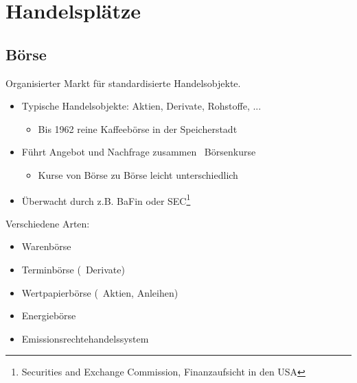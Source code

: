 \documentclass{beamer}
\begin{document}
	\section{Handelsplätze}
	
		\begin{frame}
		\end{frame}
	
		\subsection{Börse}
		
			\begin{frame}
				\begin{definition}
					Organisierter Markt für standardisierte Handelsobjekte.\citewiki[Börse]{B\%Crse}
				\end{definition}
				\begin{itemize}
					\item Typische Handelsobjekte: Aktien, Derivate, Rohstoffe, ...
					\begin{itemize}
						\item Bis 1962 reine Kaffeebörse in der Speicherstadt
					\end{itemize}
					\item Führt Angebot und Nachfrage zusammen \textrightarrow\ Börsenkurse
					\begin{itemize}
						\item Kurse von Börse zu Börse leicht unterschiedlich
					\end{itemize}
					\item Überwacht durch z.B. BaFin oder SEC\footnote{Securities and Exchange Commission, Finanzaufsicht in den USA}
				\end{itemize}
			\end{frame}
		
			\begin{frame}
				Verschiedene Arten:
				\begin{itemize}
					\item Warenbörse
					\item Terminbörse (\textrightarrow\ Derivate)
					\item Wertpapierbörse (\textrightarrow\ Aktien, Anleihen)
					\item Energiebörse
					\item Emissionsrechtehandelssystem
				\end{itemize}
			\end{frame}
		
\end{document}
